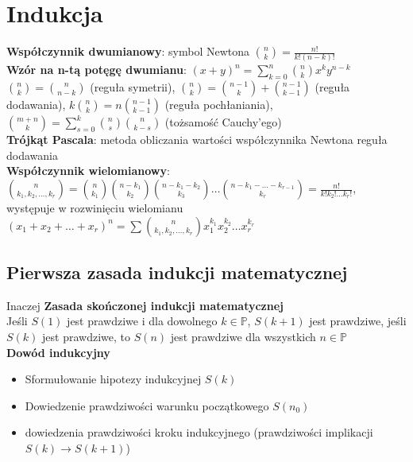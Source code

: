 \documentclass[a4paper,12pt]{article}
\begin{document}
\section{Indukcja}

\textbf{Współczynnik dwumianowy}: symbol Newtona ${{n}\choose {k}}=\frac{n!}{k!(n-k)!}$ \\
\textbf{Wzór na n-tą potęgę dwumianu}: $(x+y)^n=\sum_{k=0}^n {{n}\choose{k}}x^ky^{n-k}$ \\
${{n}\choose{k}}={{n}\choose{n-k}}$ (reguła symetrii), 
${{n}\choose{k}}={{n-1}\choose{k}}+{{n-1}\choose{k-1}}$ (reguła dodawania), 
$k{{n}\choose{k}}=n{{n-1}\choose{k-1}}$ (reguła pochłaniania), 
${{m+n}\choose{k}}=\sum_{s=0}^k {{n}\choose{s}}{{n}\choose{k-s}}$ (tożsamość Cauchy'ego) \\
\textbf{Trójkąt Pascala}: metoda obliczania wartości współczynnika Newtona {reguła dodawania}\\
\textbf{Współczynnik wielomianowy}: ${{n}\choose{k_1, k_2, \dots ,k_r}}={{n}\choose{k_1}}{{n-k_1}\choose{k_2}}{{n-k_1-k_2}\choose{k_3}}\dots {{n-k_1-\hdots -k_{r-1}}\choose{k_r}}=\frac{n!}{k!k_2!\dots k_r!}$, występuje w rozwinięciu wielomianu $(x_1+x_2+\dots +x_r)^n=\sum {{n}\choose{k_1, k_2, \dots ,k_r}}x_1^{k_1}x_2^{k_2}\dots x_ r^{k_r}$
\subsection{Pierwsza zasada indukcji matematycznej}
Inaczej \textbf{Zasada skończonej indukcji matematycznej} \\
Jeśli $S(1)$ jest prawdziwe i dla dowolnego $k \in \mathbb{P}$, $S(k+1)$ jest prawdziwe, jeśli $S(k)$ jest prawdziwe, to $S(n)$ jest prawdziwe dla wszystkich $n \in \mathbb{P}$ \\ %

\textbf{Dowód indukcyjny}
\begin{itemize} \itemsep1pt \parskip0pt 
 \item Sformułowanie hipotezy indukcyjnej $S(k)$
 \item Dowiedzenie prawdziwości warunku początkowego $S(n_0)$
 \item dowiedzenia prawdziwości kroku indukcyjnego (prawdziwości implikacji $S(k)\rightarrow S(k+1)$)
\end{itemize}
\end{document}
